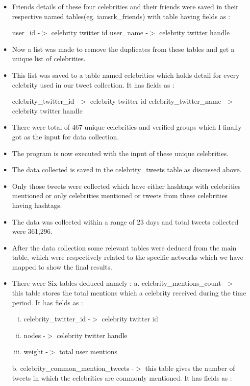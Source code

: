 \documentclass[runningheads,a4paper]{llncs}
\begin{document}
\begin{itemize}
\item	Friends details of these four celebrities and their friends were saved in their respective named tables(eg. iamsrk\_friends) with table having fields as :

\subitem	user\_id  -$>$  celebrity twitter id
\subitem	user\_name -$>$ celebrity twitter handle

\item	Now a list was made to remove the duplicates from these tables and get a unique list of celebrities.

\item This list was saved to a table named celebrities which holds detail for every celebrity used in our tweet collection. It has fields as :

\subitem	celebrity\_twitter\_id  -$>$  celebrity twitter id
\subitem	celebrity\_twitter\_name -$>$ celebrity twitter handle

\item	There were total of 467 unique celebrities and verified groups which I finally got as the input for data collection.

\item	The program is now executed with the input of these unique celebrities.

\item	The data collected is saved in the celebrity\_tweets table as discussed above.

\item Only those tweets were collected which have either hashtags with celebrities mentioned or only celebrities mentioned or tweets from these celebrities having hashtags.

\item	The data was collected within a range of 23 days and total tweets collected were 361,296.

\item	After the data collection some relevant tables were deduced from the main table, which were respectively related to the specific networks which we have mapped to show the final results.
\vspace{0.1in}
\item There were Six tables deduced namely : 
\vspace{0.1in}
\subitem	a. celebrity\_mentions\_count -$>$ this table stores the total mentions which a celebrity received during the time period. It has fields as : 

\begin{enumerate}[i.  ]
\addtolength{\itemindent}{1cm}
\item celebrity\_twitter\_id -$>$ celebrity twitter id
\item nodes -$>$ celebrity twitter handle
\item weight -$>$ total user mentions
\end{enumerate}
\vspace{0.1in}
\subitem b. celebrity\_common\_mention\_tweets -$>$ this table gives the number of tweets in which the celebrities are commonly mentioned. It has fields as :


\end{itemize}
\end{document}
